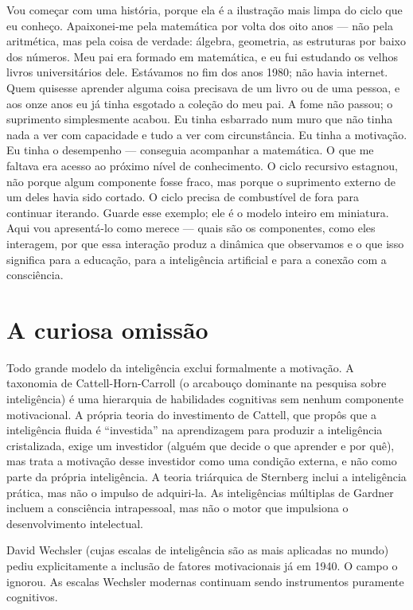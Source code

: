 \documentclass[11pt, twoside, openright]{book}
\begin{document}
Vou começar com uma história, porque ela é a ilustração mais limpa do ciclo que eu conheço. Apaixonei-me pela matemática por volta dos oito anos --- não pela aritmética, mas pela coisa de verdade: álgebra, geometria, as estruturas por baixo dos números. Meu pai era formado em matemática, e eu fui estudando os velhos livros universitários dele. Estávamos no fim dos anos 1980; não havia internet. Quem quisesse aprender alguma coisa precisava de um livro ou de uma pessoa, e aos onze anos eu já tinha esgotado a coleção do meu pai. A fome não passou; o suprimento simplesmente acabou. Eu tinha esbarrado num muro que não tinha nada a ver com capacidade e tudo a ver com circunstância. Eu tinha a motivação. Eu tinha o desempenho --- conseguia acompanhar a matemática. O que me faltava era acesso ao próximo nível de conhecimento. O ciclo recursivo estagnou, não porque algum componente fosse fraco, mas porque o suprimento externo de um deles havia sido cortado. O ciclo precisa de combustível de fora para continuar iterando. Guarde esse exemplo; ele é o modelo inteiro em miniatura. Aqui vou apresentá-lo como merece --- quais são os componentes, como eles interagem, por que essa interação produz a dinâmica que observamos e o que isso significa para a educação, para a inteligência artificial e para a conexão com a consciência.

\section*{A curiosa omissão}

Todo grande modelo da inteligência exclui formalmente a motivação. A taxonomia de Cattell-Horn-Carroll (o arcabouço dominante na pesquisa sobre inteligência) é uma hierarquia de habilidades cognitivas sem nenhum componente motivacional. A própria teoria do investimento de Cattell, que propôs que a inteligência fluida é ``investida'' na aprendizagem para produzir a inteligência cristalizada, exige um investidor (alguém que decide o que aprender e por quê), mas trata a motivação desse investidor como uma condição externa, e não como parte da própria inteligência. A teoria triárquica de Sternberg inclui a inteligência prática, mas não o impulso de adquiri-la. As inteligências múltiplas de Gardner incluem a consciência intrapessoal, mas não o motor que impulsiona o desenvolvimento intelectual.

David Wechsler (cujas escalas de inteligência são as mais aplicadas no mundo) pediu explicitamente a inclusão de fatores motivacionais já em 1940. O campo o ignorou. As escalas Wechsler modernas continuam sendo instrumentos puramente cognitivos.
\end{document}
